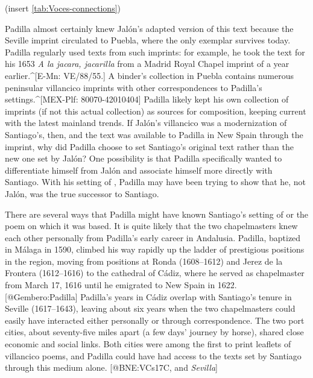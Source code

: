 (insert \cref{tab:Voces-connections})
\label{tab:Voces-connections}

Padilla almost certainly knew Jalón's adapted version of this text because the
Seville imprint circulated to Puebla, where the only exemplar survives today.
Padilla regularly used texts from such imprints: for example, he took
the text for his 1653 \emph{A la jacara, jacarilla} from a Madrid Royal Chapel
imprint of a year earlier.^[E-Mn: VE/88/55.]
A binder's collection in Puebla contains numerous peninsular villancico imprints
with other correspondences to Padilla's settings.^[MEX-Plf: 80070-42010404]
Padilla likely kept his own collection of imprints (if not this actual
collection) as sources for composition, keeping current with the latest mainland
trends.
If Jalón's villancico was a modernization of Santiago's, then, and the text was
available to Padilla in New Spain through the imprint, why did Padilla choose to
set Santiago's original text rather than the new one set by Jalón?
One possibility is that Padilla specifically wanted to differentiate himself
from Jalón and associate himself more directly with Santiago.
With his setting of , Padilla may have been trying to
show that he, not Jalón, was the true successor to Santiago.

There are several ways that Padilla might have known Santiago's setting of
 or the poem on which it was based.
It is quite likely that the two chapelmasters knew each other personally from
Padilla's early career in Andalusia.
Padilla, baptized in Málaga in 1590, climbed his way rapidly up the ladder of
prestigious positions in the region, moving from positions at Ronda (1608--1612)
and Jerez de la Frontera (1612--1616) to the cathedral of Cádiz, where he served
as chapelmaster from March 17, 1616 until he emigrated to New Spain in 1622.
[@Gembero:Padilla]
Padilla's years in Cádiz overlap with Santiago's tenure in Seville (1617--1643),
leaving about six years when the two chapelmasters could easily have interacted
either personally or through correspondence.
The two port cities, about seventy-five miles apart (a few days' journey by
horse), shared close economic and social links.
Both cities were among the first to print leaflets of villancico poems, and
Padilla could have had access to the texts set by Santiago through this medium
alone.
[@BNE:VCs17C,  and \emph{Sevilla}]

